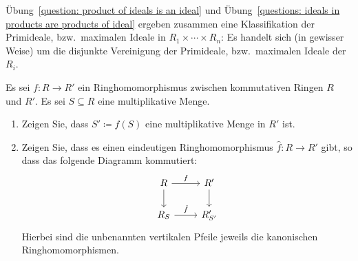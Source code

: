 \begin{remark*}
  Übung~\ref{question: product of ideals is an ideal} und Übung~\ref{questions: ideals in products are products of ideal} ergeben zusammen eine Klassifikation der Primideale, bzw.\ maximalen Ideale in $R_1 \times \dotsb \times R_n$:
  Es handelt sich (in gewisser Weise) um die disjunkte Vereinigung der Primideale, bzw.\ maximalen Ideale der $R_i$.
\end{remark*}






\begin{question}
  Es sei $f \colon R \to R'$ ein Ringhomomorphismus zwischen kommutativen Ringen $R$ und $R'$.
  Es sei $S \subseteq R$ eine multiplikative Menge.
  \begin{enumerate}
    \item
      Zeigen Sie, dass $S' \coloneqq f(S)$ eine multiplikative Menge in $R'$ ist.
    \item
      Zeigen Sie, dass es einen eindeutigen Ringhomomorphismus $\hat{f} \colon R \to R'$ gibt, so dass das folgende Diagramm kommutiert:
      \[
        \begin{tikzcd}[ampersand replacement=\&]
              R
              \arrow{r}{f}
              \arrow{d}
          \&  R'
              \arrow{d}
          \\
              R_S
              \arrow{r}{\hat{f}}
          \&  R'_{S'}
        \end{tikzcd}
      \]
      Hierbei sind die unbenannten vertikalen Pfeile jeweils die kanonischen Ringhomomorphismen.
  \end{enumerate}
\end{question}


